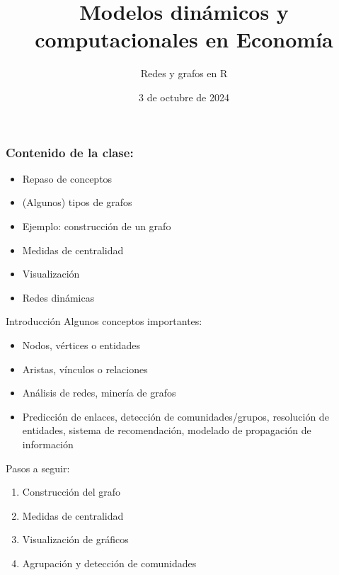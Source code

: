 \documentclass[11pt]{beamer}
\begin{document}
	\title{Modelos dinámicos y computacionales en Economía}
	\subtitle{Redes y grafos en R}
	\date{3 de octubre de 2024}


\begin{frame}
\frametitle{Contenido de la clase:}
\begin{itemize}
\item Repaso de conceptos
\item (Algunos) tipos de grafos
\item Ejemplo: construcción de un grafo
\item Medidas de centralidad
\item Visualización
\item Redes dinámicas
\end{itemize}
\end{frame}

\begin{frame}{Introducción}
Algunos conceptos importantes:
\begin{itemize}
    \item Nodos, vértices o entidades
\item Aristas, vínculos o relaciones
\item  Análisis de redes, minería de grafos
\item Predicción de enlaces, detección de comunidades/grupos, resolución de entidades, sistema de recomendación, modelado de propagación de información
\end{itemize}
Pasos a seguir:
\begin{enumerate}
\item Construcción del grafo
\item  Medidas de centralidad
\item  Visualización de gráficos
\item Agrupación y detección de comunidades
\end{enumerate}
\end{frame}
\end{document}
